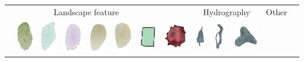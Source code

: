 \documentclass[portrait, A0]{sciposter}
\begin{document}
\begin{minipage}[b]{77cm}
\begin{multicols}{3}
\begin{tabular}{l|cccccc|c|ccc|cc|r}
 & \multicolumn{6}{c|}{Landscape feature} & & \multicolumn{3}{c|}{Hydrography} & \multicolumn{2}{c|}{Other}&\\
&\includegraphics[height=40pt]{gfx/foret_couleur.png}
&\includegraphics[height=40pt]{gfx/marais_couleur.png}
&\includegraphics[height=40pt]{gfx/vigne_couleur.png}
&\includegraphics[height=40pt]{gfx/landes_couleur.png}
&\includegraphics[height=40pt]{gfx/broussailles_couleur.png}
& \includegraphics[height=30pt]{gfx/domaine_couleur.png}
&\includegraphics[height=35pt]{gfx/ville_couleur.png}
&\includegraphics[height=25pt]{gfx/etang_couleur.png}
&\includegraphics[height=35pt]{gfx/riviere_large_couleur.png}
&\includegraphics[height=30pt]{gfx/lac_couleur.png}

\end{tabular}
\end{multicols}
\end{minipage}
\end{document}
